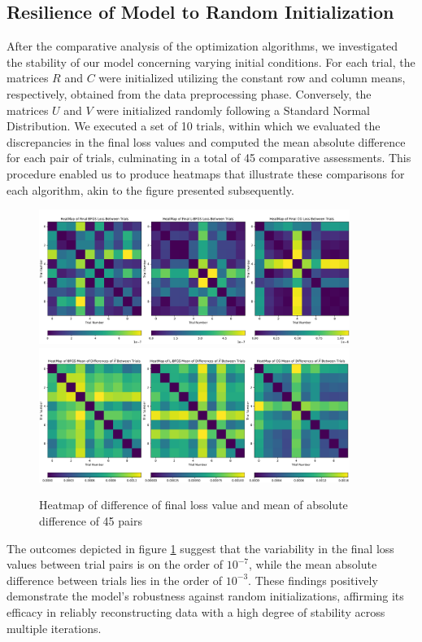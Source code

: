 \documentclass{article}
\begin{document}
\subsection{Resilience of Model to Random Initialization}
After the comparative analysis of the optimization algorithms, we investigated the stability of our model concerning varying initial conditions. For each trial, the matrices $R$ and $C$ were initialized utilizing the constant row and column means, respectively, obtained from the data preprocessing phase. Conversely, the matrices $U$ and $V$ were initialized randomly following a Standard Normal Distribution. We executed a set of 10 trials, within which we evaluated the discrepancies in the final loss values and computed the mean absolute difference for each pair of trials, culminating in a total of 45 comparative assessments. This procedure enabled us to produce heatmaps that illustrate these comparisons for each algorithm, akin to the figure presented subsequently.

\begin{figure}[ht]
    \centering
    \includegraphics[width=0.9\textwidth]{heatmap_loss.pdf}
    \includegraphics[width=0.9\textwidth]{heatmap_diff.pdf}
    \caption{Heatmap of difference of final loss value and mean of absolute difference of 45 pairs}
    \label{Heatmap}
\end{figure}


The outcomes depicted in figure \ref{Heatmap} suggest that the variability in the final loss values between trial pairs is on the order of $10^{-7}$, while the mean absolute difference between trials lies in the order of $10^{-3}$. These findings positively demonstrate the model's robustness against random initializations, affirming its efficacy in reliably reconstructing data with a high degree of stability across multiple iterations.
\end{document}

